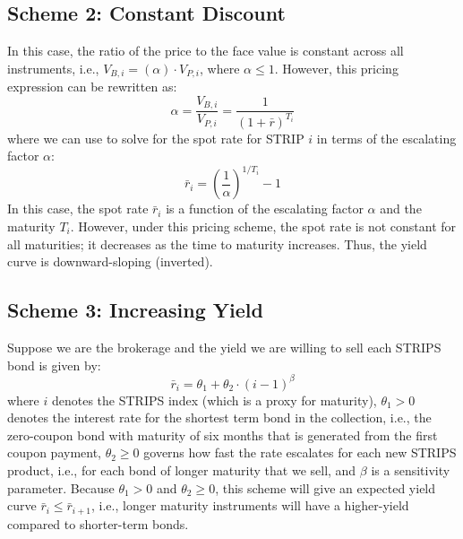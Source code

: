 \documentclass[11pt]{article}
\theoremstyle{definition}
\begin{document}
\subsection*{Scheme 2: Constant Discount}
In this case, the ratio of the price to the face value is constant across all instruments, i.e., $V_{B, i} = \left(\alpha\right)\cdot{V}_{P, i}$, where $\alpha\leq{1}$. However, this pricing expression can be rewritten as:
\begin{equation}
\alpha = \frac{V_{B,i}}{V_{P,i}} = \frac{1}{\left(1+\bar{r}\right)^{T_{i}}}
\end{equation}
where we can use to solve for the spot rate for STRIP $i$ in terms of the escalating factor $\alpha$:
\begin{equation}
\bar{r}_{i} = \left(\frac{1}{\alpha}\right)^{1/T_{i}} - 1
\end{equation}
In this case, the spot rate $\bar{r}_{i}$ is a function of the escalating factor $\alpha$ and the maturity $T_{i}$. 
However, under this pricing scheme, the spot rate is not constant for all maturities; it decreases as the time to maturity increases. Thus, the yield curve is downward-sloping (inverted).

\subsection*{Scheme 3: Increasing Yield}
Suppose we are the brokerage and the yield we are willing to sell each STRIPS bond is given by:
\begin{equation}
\bar{r}_{i} = \theta_{1}+\theta_{2}\cdot\left(i-1\right)^{\beta}
\end{equation}
where $i$ denotes the STRIPS index (which is a proxy for maturity), 
$\theta_{1}>0$ denotes the interest rate for the shortest term bond in the collection, i.e., the zero-coupon bond with maturity of six months that is generated from the first coupon payment, $\theta_{2}\geq{0}$ governs how fast the rate escalates for each new STRIPS product, i.e., for each bond of longer maturity that we sell, and $\beta$ is a sensitivity parameter. Because $\theta_{1}>{0}$ and $\theta_{2}\geq{0}$, this scheme will give an expected yield curve $\bar{r}_{i}\leq\bar{r}_{i+1}$, i.e., longer maturity instruments will have a higher-yield compared to shorter-term bonds.
\end{document}
